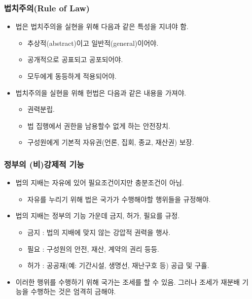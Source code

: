 \documentclass[aspectratio=169,xcolor=dvipsnames,handout]{beamer}
\begin{document}
\begin{frame}[<+->]
\frametitle{법치주의(Rule of Law)}
    \begin{itemize}
        \item 법은 법치주의을 실현을 위해 다음과 같은 특성을 지녀야 함.
        \begin{itemize}
            \item 추상적(abstract)이고 일반적(general)이어야.
            \item 공개적으로 공표되고 공포되어야. 
            \item 모두에게 동등하게 적용되어야.
        \end{itemize}
        \item 법치주의을 실현을 위해 헌법은 다음과 같은 내용을 가져야. 
        \begin{itemize}
            \item 권력분립.
            \item 법 집행에서 권한을 남용할수 없게 하는 안전장치. 
            \item 구성원에게 기본적 자유권(언론, 집회, 종교, 재산권) 보장.
        \end{itemize}
    \end{itemize}
\end{frame}

\begin{frame}[<+->]
\frametitle{정부의 (비)강제적 기능}
    \begin{itemize}
        \item 법의 지배는 자유에 있어 필요조건이지만 충분조건이 아님.
        \begin{itemize}
            \item  자유를 누리기 위해 법은 국가가 수행해야할 행위들을 규정해야.
        \end{itemize}
        \item 법의 지배는 정부의 기능 가운데 금지, 허가, 필요를 규정.
        \begin{itemize}
            \item  금지 : 법의 지배에 맞지 않는 강압적 권력을 행사.
            \item  필요 : 구성원의 안전, 재산, 계약의 권리 등등.
            \item  허가 : 공공재(예: 기간시설, 생명선, 재난구호 등) 공급 및 구휼.
        \end{itemize}
        \item 이러한 행위를 수행하기 위해 국가는 조세를 할 수 있음. 그러나 조세가 재분배 기능을 수행하는 것은 엄격히 금해야.
    \end{itemize}
\end{frame}
\end{document}
